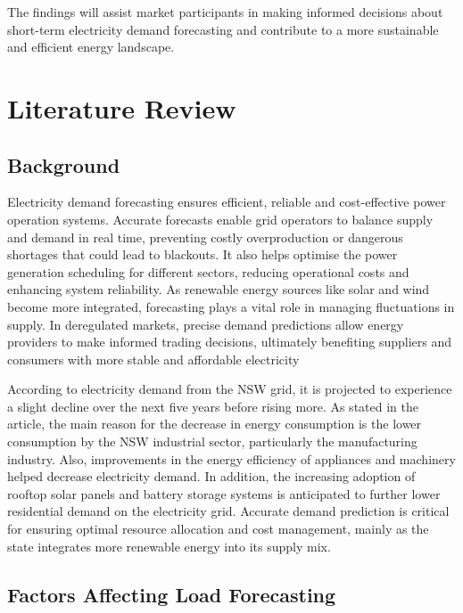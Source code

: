 \documentclass[mstat,12pt]{unswthesis}
\begin{document}
The findings will assist market participants in making informed
decisions about short-term electricity demand forecasting and contribute
to a more sustainable and efficient energy landscape.

\bigskip

\chapter{Literature Review}\label{literature-review}

\section{Background}\label{background}

Electricity demand forecasting ensures efficient, reliable and
cost-effective power operation systems. Accurate forecasts enable grid
operators to balance supply and demand in real time, preventing costly
overproduction or dangerous shortages that could lead to blackouts. It
also helps optimise the power generation scheduling for different
sectors, reducing operational costs and enhancing system reliability. As
renewable energy sources like solar and wind become more integrated,
forecasting plays a vital role in managing fluctuations in supply. In
deregulated markets, precise demand predictions allow energy providers
to make informed trading decisions, ultimately benefiting suppliers and
consumers with more stable and affordable electricity

According to \cite{nsw_epa_2021_energy_consumption} electricity demand
from the NSW grid, it is projected to experience a slight decline over
the next five years before rising more. As stated in the article, the
main reason for the decrease in energy consumption is the lower
consumption by the NSW industrial sector, particularly the manufacturing
industry. Also, improvements in the energy efficiency of appliances and
machinery helped decrease electricity demand. In addition, the
increasing adoption of rooftop solar panels and battery storage systems
is anticipated to further lower residential demand on the electricity
grid. Accurate demand prediction is critical for ensuring optimal
resource allocation and cost management, mainly as the state integrates
more renewable energy into its supply mix.

\section{Factors Affecting Load
Forecasting}\label{factors-affecting-load-forecasting}
\end{document}
